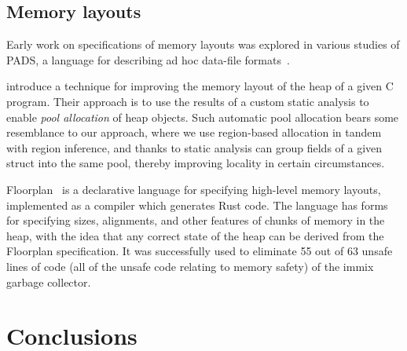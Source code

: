 \documentclass[acmsmall,review,anonymous]{acmart}\settopmatter{printfolios=true,printccs=false,printacmref=false}
\begin{document}
\subsection{Memory layouts}


Early work on specifications of memory layouts was explored in various studies of PADS, a language for describing ad hoc data-file formats~\cite{PADS, Pads2, Pads3}.

\citet{poolallocation} introduce a technique for improving the memory layout of the heap of a given C program.
Their approach is to use the results of a custom static analysis to enable \emph{pool allocation} of heap objects.
Such automatic pool allocation bears some resemblance to our approach, where we use region-based allocation in tandem with region inference, and thanks to static analysis can group fields of a given struct into the same pool, thereby
improving locality in certain circumstances.


Floorplan~\cite{Floorplan} is a declarative language for specifying high-level memory layouts, implemented as a compiler which generates Rust code. The language has forms for specifying sizes, alignments, and other features of chunks of memory in the heap, with the idea that any correct state of the heap can be derived from the Floorplan specification. It was successfully used to eliminate 55 out of 63 unsafe lines of code (all of the unsafe code relating to memory safety) of the immix garbage collector.































 \section{Conclusions}
\end{document}
